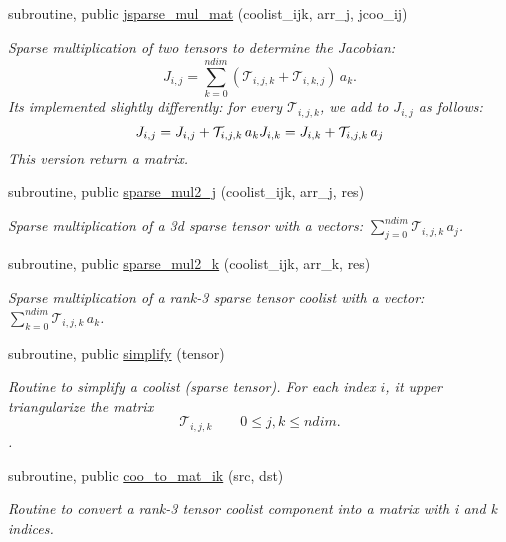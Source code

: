\begin{DoxyCompactItemize}
subroutine, public \hyperlink{namespacetensor_a4135cf70df5030070922ff199c79cc03}{jsparse\+\_\+mul\+\_\+mat} (coolist\+\_\+ijk, arr\+\_\+j, jcoo\+\_\+ij)
\begin{DoxyCompactList}\small\item\em Sparse multiplication of two tensors to determine the Jacobian\+: \[J_{i,j} = {\displaystyle \sum_{k=0}^{ndim}} \left( \mathcal{T}_{i,j,k} + \mathcal{T}_{i,k,j} \right) \, a_k.\] It\textquotesingle{}s implemented slightly differently\+: for every $\mathcal{T}_{i,j,k}$, we add to $J_{i,j}$ as follows\+: \[J_{i,j} = J_{i,j} + \mathcal{T}_{i,j,k} \, a_k \\ J_{i,k} = J_{i,k} + \mathcal{T}_{i,j,k} \, a_j\] This version return a matrix. \end{DoxyCompactList}\item 
subroutine, public \hyperlink{namespacetensor_ad9b09d91fb1bd425122c4f1ee2f0eb12}{sparse\+\_\+mul2\+\_\+j} (coolist\+\_\+ijk, arr\+\_\+j, res)
\begin{DoxyCompactList}\small\item\em Sparse multiplication of a 3d sparse tensor with a vectors\+: ${\displaystyle \sum_{j=0}^{ndim}} \mathcal{T}_{i,j,k} \, a_j $. \end{DoxyCompactList}\item 
subroutine, public \hyperlink{namespacetensor_a90e31e5e782d63d7f05ee3c9aed370e0}{sparse\+\_\+mul2\+\_\+k} (coolist\+\_\+ijk, arr\+\_\+k, res)
\begin{DoxyCompactList}\small\item\em Sparse multiplication of a rank-\/3 sparse tensor coolist with a vector\+: ${\displaystyle \sum_{k=0}^{ndim}} \mathcal{T}_{i,j,k} \, a_k $. \end{DoxyCompactList}\item 
subroutine, public \hyperlink{namespacetensor_a364522b80ab0f4785c331eb74fa1ba04}{simplify} (tensor)
\begin{DoxyCompactList}\small\item\em Routine to simplify a coolist (sparse tensor). For each index $i$, it upper triangularize the matrix \[\mathcal{T}_{i,j,k} \qquad 0 \leq j,k \leq ndim.\]. \end{DoxyCompactList}\item 
subroutine, public \hyperlink{namespacetensor_a52784eb2977ec36f8ab5ba240b497633}{coo\+\_\+to\+\_\+mat\+\_\+ik} (src, dst)
\begin{DoxyCompactList}\small\item\em Routine to convert a rank-\/3 tensor coolist component into a matrix with i and k indices. \end{DoxyCompactList}\item 

\end{DoxyCompactItemize}
